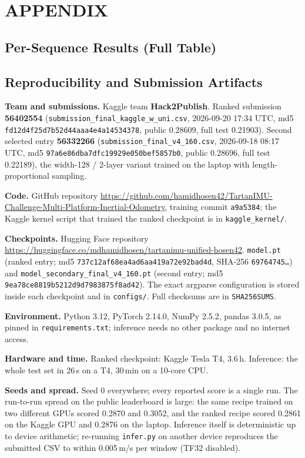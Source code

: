 \documentclass[letterpaper,10pt,conference]{ieeeconf}
\newcommand{\hfrepo}{\url{https://huggingface.co/mdhamidhosen/tartanimu-unified-hosen42}}
\newcommand{\ghrepo}{\url{https://github.com/hamidhosen42/TartanIMU-Challenge-Multi-Platform-Inertial-Odometry}}
\begin{document}
\section*{APPENDIX}
\subsection{Per-Sequence Results (Full Table)}


\subsection{Reproducibility and Submission Artifacts}
\label{sec:selection}
\begin{sloppypar}\raggedright
\textbf{Team and submissions.} Kaggle team \textbf{Hack2Publish}. Ranked submission \textbf{56402554}
(\texttt{submission\_final\_kaggle\_w\_uni.csv}, 2026-09-20 17:34 UTC, md5 \texttt{fd12d4f25d7b52d44aaa4e4a14534378},
public 0.28609, full test 0.21903). Second selected entry \textbf{56332266} (\texttt{submission\_final\_v4\_160.csv},
2026-09-18 08:17 UTC, md5 \texttt{97a6e86dba7dfc19929e050bef5857b0}, public 0.28696, full test 0.22189), the
width-128 / 2-layer variant trained on the laptop with length-proportional sampling.

\textbf{Code.} GitHub repository \ghrepo, training commit \texttt{a9a5384}; the Kaggle kernel script that trained the
ranked checkpoint is in \texttt{kaggle\_kernel/}.

\textbf{Checkpoints.} Hugging Face repository \hfrepo. \texttt{model.pt} (ranked entry; md5 \texttt{737c12af68ea4ad6aa419a72e92bad4d},
SHA-256 \texttt{69764745\ldots}) and \texttt{model\_secondary\_final\_v4\_160.pt} (second entry; md5
\texttt{9ea78ce8819b5212d9d7983875f8ad42}). The exact argparse configuration is stored inside each checkpoint and in \texttt{configs/}.
Full checksums are in \texttt{SHA256SUMS}.

\textbf{Environment.} Python 3.12, PyTorch 2.14.0, NumPy 2.5.2, pandas 3.0.5, as pinned in \texttt{requirements.txt};
inference needs no other package and no internet access.

\textbf{Hardware and time.} Ranked checkpoint: Kaggle Tesla T4, 3.6\,h. Inference: the whole test set in 26\,s on a T4, 30\,min on a 10-core CPU.

\textbf{Seeds and spread.} Seed 0 everywhere; every reported score is a single run. The run-to-run spread on the
public leaderboard is large: the same recipe trained on two different GPUs scored 0.2870 and 0.3052, and the ranked
recipe scored 0.2861 on the Kaggle GPU and 0.2876 on the laptop. Inference itself is deterministic up to device
arithmetic; re-running \texttt{infer.py} on another device reproduces the submitted CSV to within 0.005\,m/s per
window (TF32 disabled).


\end{sloppypar}
\end{document}
